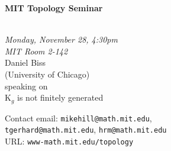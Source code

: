 \documentclass{slides}
\begin{document}
\begin{center}

{\fontsize {54pt}{40pt}\selectfont

\textrm{
{\textbf{MIT Topology Seminar}}}
}\\
\vspace{1cm}
{\large\textrm{\emph{Monday, November 28, 4:30pm\\MIT Room 2-142}}}\\
\vspace{1cm}
\textrm{{\LARGE Daniel Biss  \\[.5cm](University of Chicago)}}\\
\vspace{1cm} %
\textrm{speaking on}\\ %
\vspace{5mm}
\textrm{{\LARGE K$_g$ is not finitely generated}}\\
\end{center}
\vspace{1cm}
{\tiny

\textrm{Contact email: } \texttt{mikehill@math.mit.edu},\\
 \texttt{tgerhard@math.mit.edu},
\texttt{hrm@math.mit.edu}\\
\textrm{URL: } \texttt{www-math.mit.edu/topology}
}
\end{document}

